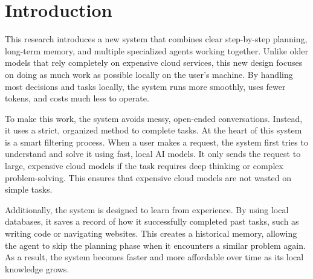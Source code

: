 \section{Introduction}
This research introduces a new system that combines clear step-by-step planning, long-term memory, and multiple specialized agents working together. Unlike older models that rely completely on expensive cloud services, this new design focuses on doing as much work as possible locally on the user's machine. By handling most decisions and tasks locally, the system runs more smoothly, uses fewer tokens, and costs much less to operate.

To make this work, the system avoids messy, open-ended conversations. Instead, it uses a strict, organized method to complete tasks. At the heart of this system is a smart filtering process. When a user makes a request, the system first tries to understand and solve it using fast, local AI models. It only sends the request to large, expensive cloud models if the task requires deep thinking or complex problem-solving. This ensures that expensive cloud models are not wasted on simple tasks.

Additionally, the system is designed to learn from experience. By using local databases, it saves a record of how it successfully completed past tasks, such as writing code or navigating websites. This creates a historical memory, allowing the agent to skip the planning phase when it encounters a similar problem again. As a result, the system becomes faster and more affordable over time as its local knowledge grows.

